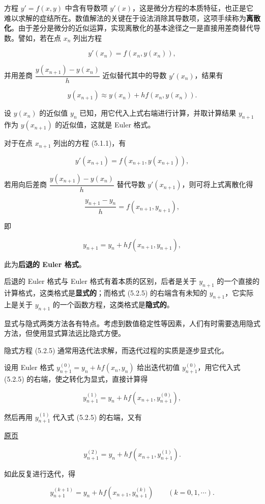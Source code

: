 \documentclass[
  10pt,
  fontset=fandol]{ctexart}
\begin{document}
方程 \(y'=f(x,y)\) 中含有导数项 \(y'(x)\)，这是微分方程的本质特征，也正是它难以求解的症结所在。数值解法的关键在于设法消除其导数项，这项手续称为\textbf{离散化}。由于差分是微分的近似运算，实现离散化的基本途径之一是直接用差商替代导数。譬如，若在点 \(x_n\) 列出方程

\[
y'(x_n)=f(x_n,y(x_n)),\tag{5.2.4}
\]

并用差商 \(\dfrac{y(x_{n+1})-y(x_n)}{h}\) 近似替代其中的导数 \(y'(x_n)\)，结果有

\[
y(x_{n+1})\approx y(x_n)+hf(x_n,y(x_n)).
\]

设 \(y(x_n)\) 的近似值 \(y_n\) 已知，用它代入上式右端进行计算，并取计算结果 \(y_{n+1}\) 作为 \(y(x_{n+1})\) 的近似值，这就是 Euler 格式。

对于在点 \(x_{n+1}\) 列出的方程 (5.1.1)，有

\[
y'(x_{n+1})=f(x_{n+1},y(x_{n+1})),
\]

若用向后差商 \(\dfrac{y(x_{n+1})-y(x_n)}{h}\) 替代导数 \(y'(x_{n+1})\)，则可将上式离散化得

\[
\frac{y_{n+1}-y_n}{h}=f(x_{n+1},y_{n+1}),
\]

即

\[
y_{n+1}=y_n+hf(x_{n+1},y_{n+1}),\tag{5.2.5}
\]

此为\textbf{后退的 Euler 格式}。

后退的 Euler 格式与 Euler 格式有着本质的区别，后者是关于 \(y_{n+1}\) 的一个直接的计算格式，这类格式是\textbf{显式的}；而格式 (5.2.5) 的右端含有未知的 \(y_{n+1}\)，它实际上是关于 \(y_{n+1}\) 的一个函数方程，这类格式是\textbf{隐式的}。

显式与隐式两类方法各有特点。考虑到数值稳定性等因素，人们有时需要选用隐式方法，但使用显式算法远比隐式方便。

隐式方程 (5.2.5) 通常用迭代法求解，而迭代过程的实质是逐步显式化。

设用 Euler 格式 \(y_{n+1}^{(0)}=y_n+hf(x_n,y_n)\) 给出迭代初值 \(y_{n+1}^{(0)}\)，用它代入式 (5.2.5) 的右端，使之转化为显式，直接计算得

\[
y_{n+1}^{(1)}=y_n+hf(x_{n+1},y_{n+1}^{(0)}),
\]

然后再用 \(y_{n+1}^{(1)}\) 代入式 (5.2.5) 的右端，又有

\href{../../source-images/pdf-122.jpeg}{原页}

\[
y_{n+1}^{(2)}=y_n+hf(x_{n+1},y_{n+1}^{(1)}).
\]

如此反复进行迭代，得

\[
y_{n+1}^{(k+1)}=y_n+hf(x_{n+1},y_{n+1}^{(k)})\qquad(k=0,1,\cdots).
\]
\end{document}
